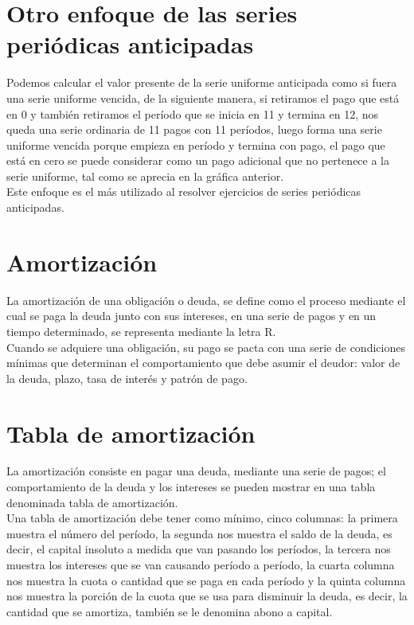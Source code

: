 




	\section{Otro enfoque de las series periódicas anticipadas}
	Podemos calcular el valor presente de la serie uniforme anticipada como si fuera una serie uniforme vencida, de la siguiente manera, si retiramos el pago que está en 0 y también retiramos el período que se inicia en 11 y termina en 12, nos queda una serie ordinaria de 11 pagos con 11 períodos, luego forma una serie uniforme vencida porque empieza en período y termina con pago, el pago que está en cero se puede considerar como un pago adicional que no pertenece a la serie uniforme, tal como se aprecia en la gráfica anterior.\\

	Este enfoque es el más utilizado al resolver ejercicios de series periódicas anticipadas.


   


    \section{Amortización}

    La amortización de una obligación o deuda, se define como el proceso mediante el cual se paga la deuda junto con sus intereses, en una serie de pagos y en un tiempo determinado, se representa mediante la letra R.\\
    
    Cuando se adquiere una obligación, su pago se pacta con una serie de condiciones mínimas que determinan el comportamiento que debe asumir el deudor: valor de la deuda, plazo, tasa de interés y patrón de pago.\\


	\section{Tabla de amortización}
	La amortización consiste en pagar una deuda, mediante una serie de pagos; el comportamiento de la deuda y los intereses se pueden mostrar en una tabla denominada tabla de amortización.\\
	Una tabla de amortización debe tener como mínimo, cinco columnas: la primera muestra el número del período, la segunda nos muestra el saldo de la deuda, es decir, el capital insoluto a medida que van pasando los períodos, la tercera nos muestra los intereses que se van causando período a período, la cuarta columna nos muestra la cuota o cantidad que se paga en cada período y la quinta columna nos muestra la porción de la cuota que se usa para disminuir la deuda, es decir, la cantidad que se amortiza, también se le denomina abono a capital.
	\vspace{1mm}

